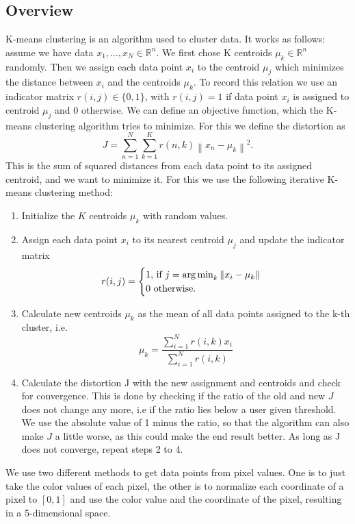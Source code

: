 \subsection{Overview}
K-means clustering is an algorithm used to cluster data. It works as follows: assume we have data $x_1,\ldots,x_N \in \mathbb{R}^n$. We first chose K centroids $\mu_k \in \mathbb{R}^n$ randomly. Then we assign each data point $x_i$ to the centroid $\mu_j$ which minimizes the distance between $x_i$ and the centroids $\mu_k$. To record this relation we use an indicator matrix $r(i,j) \in \{0,1\}$, with $r(i,j)=1$ if data point $x_i$ is assigned to centroid $\mu_j$ and $0$ otherwise. We can define an objective function, which the K-means clustering algorithm tries to minimize. For this we define the distortion as
\begin{equation}
	J = \sum_{n=1}^{N} \sum_{k=1}^{K} r(n,k) \left\|x_n-\mu_k\right\|^2.
\end{equation}
This is the sum of squared distances from each data point to its assigned centroid, and we want to minimize it. For this we use the following iterative K-means clustering method:
\begin{enumerate}
\item Initialize the $K$ centroids $\mu_k$ with random values.
\item Assign each data point $x_i$ to its nearest centroid $\mu_j$ and update the indicator matrix
\[
	r(i,j)= \begin{cases}
               1 \text{, if } j = \operatorname*{arg\,min}_k\left\|x_i-\mu_k\right\| \\

             0 \text{ otherwise.}
            \end{cases}
\]
\item Calculate new centroids $\mu_k$ as the mean of all data points assigned to the k-th cluster, i.e. 
\[
	\mu_k = \frac{\sum\limits_{i=1}^N r(i,k) x_i}{\sum\limits_{i=1}^N r(i,k)}
\]
\item Calculate the distortion J with the new assignment and centroids and check for convergence. This is done by checking if the ratio of the old and new $J$ does not change any more, i.e if the ratio lies below a user given threshold. We use the absolute value of 1 minus the ratio, so that the algorithm can also make $J$ a little worse, as this could make the end result better. As long as J does not converge, repeat steps 2 to 4.
\end{enumerate} 

We use two different methods to get data points from pixel values. One is to just take the color values of each pixel, the other is to normalize each coordinate of a pixel to $[0, 1]$ and use the color value and the coordinate of the pixel, resulting in a 5-dimensional space.

